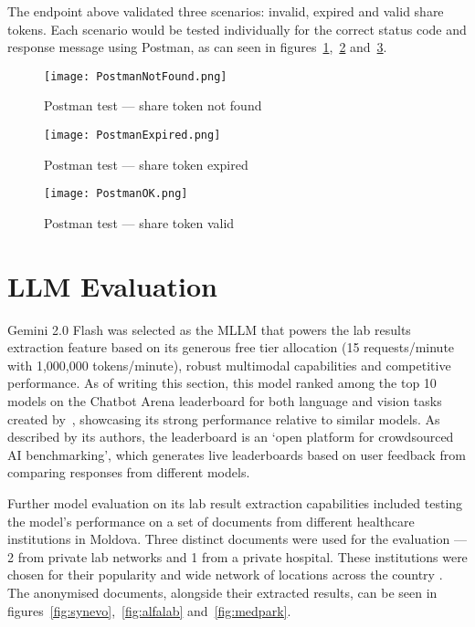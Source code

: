 The endpoint above validated three scenarios: invalid, expired and valid share tokens. Each scenario would be tested individually for the correct status code and response message using Postman, as can seen in figures~\ref{fig:postman1},~\ref{fig:postman2} and~\ref{fig:postman3}.

\begin{figure}[htbp]
    \centering
    \texttt{[image: PostmanNotFound.png]}
    \caption{Postman test --- share token not found}\label{fig:postman1}
\end{figure}

\begin{figure}[htbp]
    \centering
    \texttt{[image: PostmanExpired.png]}
    \caption{Postman test --- share token expired}\label{fig:postman2}
\end{figure}

\begin{figure}[htbp]
    \centering
    \texttt{[image: PostmanOK.png]}
    \caption{Postman test --- share token valid}\label{fig:postman3}
\end{figure}

\FloatBarrier{}

\section{LLM Evaluation}

Gemini 2.0 Flash was selected as the MLLM that powers the lab results extraction feature based on its generous free tier allocation (15 requests/minute with 1,000,000 tokens/minute), robust multimodal capabilities and competitive performance. As of writing this section, this model ranked among the top 10 models on the Chatbot Arena leaderboard for both language and vision tasks created by~\cite{chatbotarena}, showcasing its strong performance relative to similar models. As described by its authors, the leaderboard is an `open platform for crowdsourced AI benchmarking', which generates live leaderboards based on user feedback from comparing responses from different models.

Further model evaluation on its lab result extraction capabilities included testing the model's performance on a set of documents from different healthcare institutions in Moldova. Three distinct documents were used for the evaluation --- 2 from private lab networks and 1 from a private hospital. These institutions were chosen for their popularity and wide network of locations across the country \parencite{alfalab, synevo, medpark}. The anonymised documents, alongside their extracted results, can be seen in figures~\ref{fig:synevo},~\ref{fig:alfalab} and~\ref{fig:medpark}.

